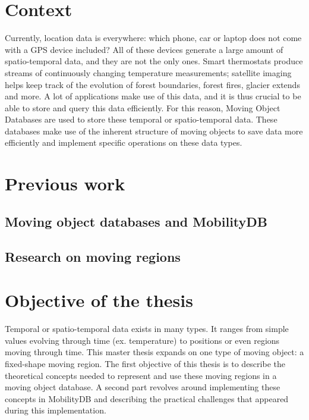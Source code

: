 \section{Context}

Currently, location data is everywhere: which phone, car or laptop does not come with a GPS device included? All of these devices generate a large amount of spatio-temporal data, and they are not the only ones. 
Smart thermostats produce streams of continuously changing temperature measurements; satellite imaging helps keep track of the evolution of forest boundaries, forest fires, glacier extends and more. 
A lot of applications make use of this data, and it is thus crucial to be able to store and query this data efficiently. For this reason, Moving Object Databases are used to store these temporal or spatio-temporal data. These databases make use of the inherent structure of moving objects to save data more efficiently and implement specific operations on these data types.


\section{Previous work}


	\subsection{Moving object databases and MobilityDB}


	\subsection{Research on moving regions}


\section{Objective of the thesis}

Temporal or spatio-temporal data exists in many types. It ranges from simple values evolving through time (ex. temperature) to positions or even regions moving through time. This master thesis expands on one type of moving object: a fixed-shape moving region. The first objective of this thesis is to describe the theoretical concepts needed to represent and use these moving regions in a moving object database. A second part revolves around implementing these concepts in MobilityDB and describing the practical challenges that appeared during this implementation.

